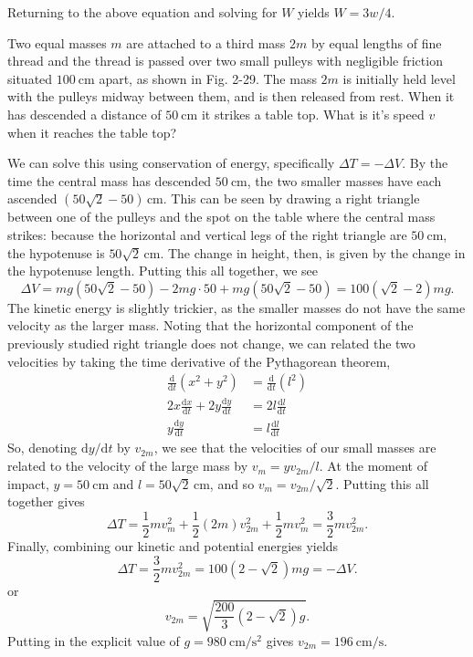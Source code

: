 \documentclass[../feynman-lectures-on-physics.tex]{subfiles}
\begin{document}
\begin{questions}
\begin{solution}
	Returning to the above equation and solving for $W$ yields $W = 3w/4$.
\end{solution}

\question Two equal masses $m$ are attached to a third mass $2m$ by equal lengths of fine thread and the thread is passed over two small pulleys with negligible friction situated $\SI{100}{\centi\meter}$ apart, as shown in Fig. 2-29. The mass $2m$ is initially held level with the pulleys midway between them, and is then released from rest. When it has descended a distance of $\SI{50}{\centi\meter}$ it strikes a table top. What is it's speed $v$ when it reaches the table top?

\begin{solution}
	We can solve this using conservation of energy, specifically $\Delta{T} = -\Delta{V}$. By the time the central mass has descended $\SI{50}{\centi\meter}$, the two smaller masses have each ascended $(50\sqrt{2} - 50)\,\si{\centi\meter}$. This can be seen by drawing a right triangle between one of the pulleys and the spot on the table where the central mass strikes: because the horizontal and vertical legs of the right triangle are $\SI{50}{\centi\meter}$, the hypotenuse is $50\sqrt{2}\,\si{\centi\meter}$. The change in height, then, is given by the change in the hypotenuse length. Putting this all together, we see
	\[
	\Delta{V} = mg(50\sqrt{2}-50) - 2mg\cdot{50} + mg(50\sqrt{2}-50) = 100(\sqrt{2}-2)mg.
	\] 
	The kinetic energy is slightly trickier, as the smaller masses do not have the same velocity as the larger mass. Noting that the horizontal component of the previously studied right triangle does not change, we can related the two velocities by taking the time derivative of the Pythagorean theorem,
	\begin{align}
		\frac{\mathrm{d}}{\mathrm{d}t}(x^2 + y^2) &= \frac{\mathrm{d}}{\mathrm{d}t}(l^2) \\
		2x\frac{\mathrm{d}x}{\mathrm{d}t} + 2y\frac{\mathrm{d}y}{\mathrm{d}t} &= 2l\frac{\mathrm{d}l}{\mathrm{d}t} \\
		y\frac{\mathrm{d}y}{\mathrm{d}t} &= l\frac{\mathrm{d}l}{\mathrm{d}t}
	\end{align}
	So, denoting $\mathrm{d}y/\mathrm{d}t$ by $v_{2m}$, we see that the velocities of our small masses are related to the velocity of the large mass by $v_{m} = yv_{2m}/l$. At the moment of impact, $y = \SI{50}{\centi\meter}$ and $l = 50\sqrt{2}\,\si{\centi\meter}$, and so $v_m = v_{2m}/\sqrt{2}$. Putting this all together gives
	\[
	\Delta{T} = \frac{1}{2}mv_m^2 + \frac{1}{2}(2m)v_{2m}^2 + \frac{1}{2}mv_m^2 = \frac{3}{2}mv_{2m}^2.
	\] 
	Finally, combining our kinetic and potential energies yields
	\[
	\Delta{T} = \frac{3}{2}mv_{2m}^2 = 100(2-\sqrt{2})mg = -\Delta{V}.
	\] 
	or
	\[
	v_{2m} = \sqrt{\frac{200}{3}(2-\sqrt{2})g}.
	\] 
	Putting in the explicit value of $g=\SI{980}{\centi\meter\per\second\squared}$ gives $v_{2m} = \SI{196}{\centi\meter\per\second}$.
\end{solution}


\end{questions}
\end{document}
